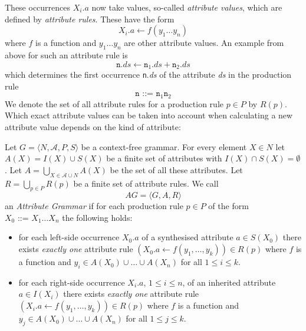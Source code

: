 These occurrences $X_i.a$ now take values, so-called \emph{attribute values}, which are defined by %
 \emph{attribute rules}. These have the form %
\[X_i.a \leftarrow f(y_1\ldots y_n)\]
where $f$ is a function and $y_1\ldots y_n$ are other attribute values. 
An example from above for such an attribute rule is 
\[\texttt{n}.\textit{ds}\leftarrow \texttt{n}_1.\textit{ds}+\texttt{n}_2.\textit{ds} \]
which determines the first occurrence \texttt{n}.\textit{ds} of the attribute \textit{ds} in the production rule
\[
 \texttt{n ::= n}_1 \texttt{n}_2
\]
We denote the set of all
attribute rules for a production rule $p\in P$ by $R(p)$. 
Which exact attribute values can be taken into account when calculating a new attribute value  depends on the kind of attribute:
\begin{definition}
Let $G=\langle N, \mathcal{A}, P, S\rangle$ be a context-free grammar.
For every element $X\in N$ let $A(X)=I(X)\cup S(X)$ be a finite set of attributes with  $I(X)\cap S(X)=\emptyset$. Let $A=\bigcup_{X\in \mathcal{A}\cup N} A(X)$ 
be the set of all these attributes.
Let  $R=\bigcup_{p\in P} R(p)$ be a finite set of attribute rules.
We call \[AG=\langle G, A, R\rangle\] an \emph{Attribute Grammar} 
if for each production rule $p\in P$ of the form $X_0 \texttt{ ::= } X_1\ldots X_n$ the following holds:
\begin{itemize}
\item for each left-side occurrence $X_0.a$ of a synthesised attribute $a\in S(X_0)$
there exists \emph{exactly one} attribute rule $(X_0.a \leftarrow f(y_1,\ldots,y_k))\in R(p)$ where $f$ is a function and $y_i\in A(X_0)\cup \ldots \cup A(X_n)$ for all $1\leq i \leq k$.
\item for each right-side occurrence $X_i.a$, $1\leq i \leq n$, of an inherited attribute  $a\in I(X_i)$
there exists \emph{exactly one} attribute rule %
$(X_i.a \leftarrow f(y_1,\ldots,y_k))\in R(p)$ where $f$ is a function and $y_j\in A(X_0)\cup \ldots \cup A(X_n)$ for all $1\leq j \leq k$.
\end{itemize}
\end{definition}


